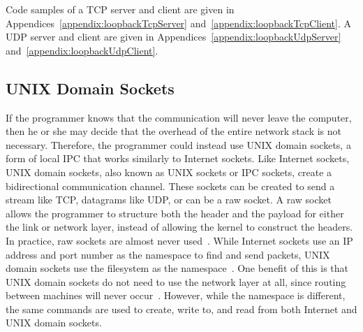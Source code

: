 Code samples of a TCP server and client are given in Appendices~\ref{appendix:loopbackTcpServer} and~\ref{appendix:loopbackTcpClient}.  A UDP server and client are given in Appendices~\ref{appendix:loopbackUdpServer} and~\ref{appendix:loopbackUdpClient}.

\subsection{UNIX Domain Sockets}
\label{sec:unixDomainSockets}
If the programmer knows that the communication will never leave the computer, then he or she may decide that the overhead of the entire network stack is not necessary.  Therefore, the programmer could instead use UNIX domain sockets, a form of local IPC that works similarly to Internet sockets.  Like Internet sockets, UNIX domain sockets, also known as UNIX sockets or IPC sockets, create a bidirectional communication channel.  These sockets can be created to send a stream like TCP, datagrams like UDP, or can be a raw socket.  A raw socket allows the programmer to structure both the header and the payload for either the link or network layer, instead of allowing the kernel to construct the headers.  In practice, raw sockets are almost never used~\cite[p 229--230]{Stevens:1996:TIT:233130}.  While Internet sockets use an IP address and port number as the namespace to find and send packets, UNIX domain sockets use the filesystem as the namespace~\cite[p 231]{Stevens:1996:TIT:233130}.  One benefit of this is that UNIX domain sockets do not need to use the network layer at all, since routing between machines will never occur~\cite[p 753]{mckusick_neville-neil_watson_2015}.  However, while the namespace is different, the same commands are used to create, write to, and read from both Internet and UNIX domain sockets.

